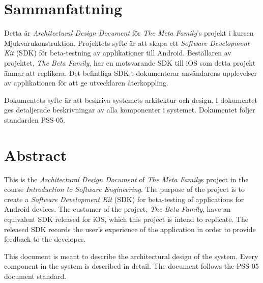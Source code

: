 \section*{Sammanfattning} %
Detta är \textit{Architectural Design Document} för \textit{The Meta Family}'s projekt i kursen Mjukvarukonstruktion. Projektets syfte är att skapa ett \textit{Software Development Kit} (SDK) för beta-testning av applikationer till Android. Beställaren av projektet, \textit{The Beta Family}, har en motsvarande SDK till iOS som detta projekt ämnar att replikera. Det befintliga SDK:t dokumenterar användarens upplevelser av applikationen för att ge utvecklaren återkoppling.

Dokumentets syfte är att beskriva systemets arkitektur och design. I dokumentet ges detaljerade beskrivningar av alla komponenter i systemet. Dokumentet följer standarden PSS-05.

\section*{Abstract} %
This is the \textit{Architectural Design Document} of \textit{The Meta Family}s project in the course \textit{Introduction to Software Engineering}. The purpose of the project is to create a \textit{Software Development Kit} (SDK) for beta-testing of applications for Android devices. The customer of the project, \textit{The Beta Family}, have an equivalent SDK released for iOS, which this project is intend to replicate. The released SDK records the user's experience of the application in order to provide feedback to the developer.

This document is meant to describe the architectural design of the system. Every component in the system is described in detail. The document follows the PSS-05 document standard.